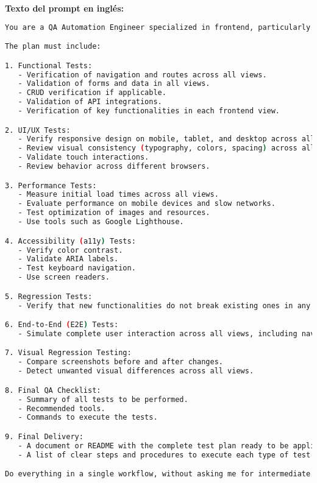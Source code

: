 \documentclass[12pt,a4paper]{article}
\begin{document}
\textbf{Texto del prompt en inglés:}
\begin{lstlisting}[language=bash]
You are a QA Automation Engineer specialized in frontend, particularly in projects built with Vite + React. Your task is to generate a complete and detailed test plan for an existing project, ensuring that all frontend views are evaluated. The plan must include both manual and automated tests, focusing on guaranteeing quality, performance, accessibility, functionality, and user experience.

The plan must include:

1. Functional Tests:
   - Verification of navigation and routes across all views.
   - Validation of forms and data in all views.
   - CRUD verification if applicable.
   - Validation of API integrations.
   - Verification of key functionalities in each frontend view.

2. UI/UX Tests:
   - Verify responsive design on mobile, tablet, and desktop across all views.
   - Review visual consistency (typography, colors, spacing) across all views.
   - Validate touch interactions.
   - Review behavior across different browsers.

3. Performance Tests:
   - Measure initial load times across all views.
   - Evaluate performance on mobile devices and slow networks.
   - Test optimization of images and resources.
   - Use tools such as Google Lighthouse.

4. Accessibility (a11y) Tests:
   - Verify color contrast.
   - Validate ARIA labels.
   - Test keyboard navigation.
   - Use screen readers.

5. Regression Tests:
   - Verify that new functionalities do not break existing ones in any view.

6. End-to-End (E2E) Tests:
   - Simulate complete user interaction across all views, including navigation and key processes.

7. Visual Regression Testing:
   - Compare screenshots before and after changes.
   - Detect unwanted visual differences across all views.

8. Final QA Checklist:
   - Summary of all tests to be performed.
   - Recommended tools.
   - Commands to execute the tests.

9. Final Delivery:
   - A document or README with the complete test plan ready to be applied to the Vite + React project.
   - A list of clear steps and procedures to execute each type of test across all views.

Do everything in a single workflow, without asking me for intermediate confirmation. The result must be a complete plan, ready to be applied to the project, including all necessary tests to ensure quality across all frontend views.
\end{lstlisting}
\end{document}
